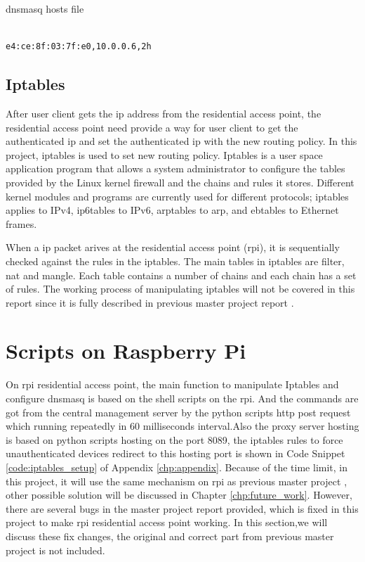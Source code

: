 \begin{algorithm}[h]
  \caption{dnsmasq hosts file}
  \label{code:dnsmasq_hosts}
  \begin{verbatim}
  
e4:ce:8f:03:7f:e0,10.0.0.6,2h
 \end{verbatim}
\end{algorithm}

\subsection{Iptables}
\par After user client gets the \gls{ip} address from the residential access point, the residential access point need provide a way for user client to get the authenticated \gls{ip} and set the authenticated \gls{ip} with the new routing policy. In this project, iptables\cite{iptables} is used to set new routing policy. Iptables is a user space application program that allows a system administrator to configure the tables provided by the Linux kernel firewall and the chains and rules it stores. Different kernel modules and programs are currently used for different protocols; iptables applies to IPv4, ip6tables to IPv6, arptables to \gls{arp}, and ebtables to Ethernet frames.
\par When a \gls{ip} packet arives at the residential access point (\gls{rpi}), it is sequentially checked against the rules in the iptables. The main tables in iptables are filter, nat and mangle. Each table contains a number of chains and each chain has a set of rules. The working process of manipulating iptables will not be covered in this report since it is fully described in previous master project report \cite{TorgeirMR}.

\section{Scripts on Raspberry Pi}
\label{sec:scripts_rpi}
\par On \gls{rpi} residential access point, the main function to manipulate Iptables and configure dnsmasq is based on the shell scripts on the \gls{rpi}. And the commands are got from the central management server by the python scripts \gls{http} post request which running repeatedly in 60 milliseconds interval.Also the proxy server hosting is based on python scripts hosting on the port 8089, the iptables rules to force unauthenticated devices redirect to this hosting port is shown in Code Snippet \ref{code:iptables_setup} of Appendix \ref{chp:appendix}. Because of the time limit, in this project, it will use the same mechanism on \gls{rpi} as previous master project \cite{TorgeirMR}, other possible solution will be discussed in Chapter \ref{chp:future_work}. However, there are several bugs in the master project report provided, which is fixed in this project to make \gls{rpi} residential access point working. In this section,we will discuss these fix changes, the original and correct part from previous master project is not included.
